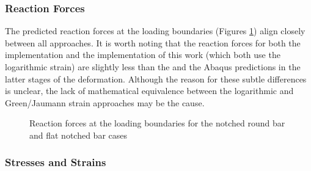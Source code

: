 \documentclass[sn-mathphys,Numbered,draft]{sn-jnl}%
\begin{document}
\subsubsection{Reaction Forces}

The predicted reaction forces at the loading boundaries (Figures \ref{fig:plastic_forces}) align closely between all approaches.
It is worth noting that the reaction forces for both the \citet{clancy_improving_2019} implementation and the implementation of this work (which both use the logarithmic strain) are slightly less than the \citet{cardiff_lagrangian_2017}  and the Abaqus predictions in the latter stages of the deformation.
Although the reason for these subtle differences is unclear, the lack of mathematical equivalence between the logarithmic and Green/Jaumann strain approaches may be the cause.
\begin{figure}[htbp]
	\centering
		\caption{Reaction forces at the loading boundaries for the notched round bar and flat notched bar cases}
	\label{fig:plastic_forces}
\end{figure}
\FloatBarrier



\subsubsection{Stresses and Strains}
\end{document}

